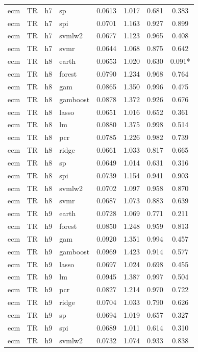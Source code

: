 \begin{ThreePartTable}
\begin{longtable}[t]{llclcccc}
ecm & TR & h7 & sp & 0.0613 & 1.017 & 0.681 & 0.383\\
ecm & TR & h7 & spi & 0.0701 & 1.163 & 0.927 & 0.899\\
ecm & TR & h7 & svmlw2 & 0.0677 & 1.123 & 0.965 & 0.408\\
ecm & TR & h7 & svmr & 0.0644 & 1.068 & 0.875 & 0.642\\
\addlinespace
ecm & TR & h8 & earth & 0.0653 & 1.020 & 0.630 & 0.091*\\
ecm & TR & h8 & forest & 0.0790 & 1.234 & 0.968 & 0.764\\
ecm & TR & h8 & gam & 0.0865 & 1.350 & 0.996 & 0.475\\
ecm & TR & h8 & gamboost & 0.0878 & 1.372 & 0.926 & 0.676\\
ecm & TR & h8 & lasso & 0.0651 & 1.016 & 0.652 & 0.361\\
ecm & TR & h8 & lm & 0.0880 & 1.375 & 0.998 & 0.514\\
ecm & TR & h8 & pcr & 0.0785 & 1.226 & 0.982 & 0.739\\
ecm & TR & h8 & ridge & 0.0661 & 1.033 & 0.817 & 0.665\\
ecm & TR & h8 & sp & 0.0649 & 1.014 & 0.631 & 0.316\\
ecm & TR & h8 & spi & 0.0739 & 1.154 & 0.941 & 0.903\\
ecm & TR & h8 & svmlw2 & 0.0702 & 1.097 & 0.958 & 0.870\\
ecm & TR & h8 & svmr & 0.0687 & 1.073 & 0.883 & 0.639\\
\addlinespace
ecm & TR & h9 & earth & 0.0728 & 1.069 & 0.771 & 0.211\\
ecm & TR & h9 & forest & 0.0850 & 1.248 & 0.959 & 0.813\\
ecm & TR & h9 & gam & 0.0920 & 1.351 & 0.994 & 0.457\\
ecm & TR & h9 & gamboost & 0.0969 & 1.423 & 0.914 & 0.577\\
ecm & TR & h9 & lasso & 0.0697 & 1.024 & 0.698 & 0.455\\
ecm & TR & h9 & lm & 0.0945 & 1.387 & 0.997 & 0.504\\
ecm & TR & h9 & pcr & 0.0827 & 1.214 & 0.970 & 0.722\\
ecm & TR & h9 & ridge & 0.0704 & 1.033 & 0.790 & 0.626\\
ecm & TR & h9 & sp & 0.0694 & 1.019 & 0.657 & 0.327\\
ecm & TR & h9 & spi & 0.0689 & 1.011 & 0.614 & 0.310\\
ecm & TR & h9 & svmlw2 & 0.0732 & 1.074 & 0.933 & 0.838\\

\end{longtable}
\end{ThreePartTable}
